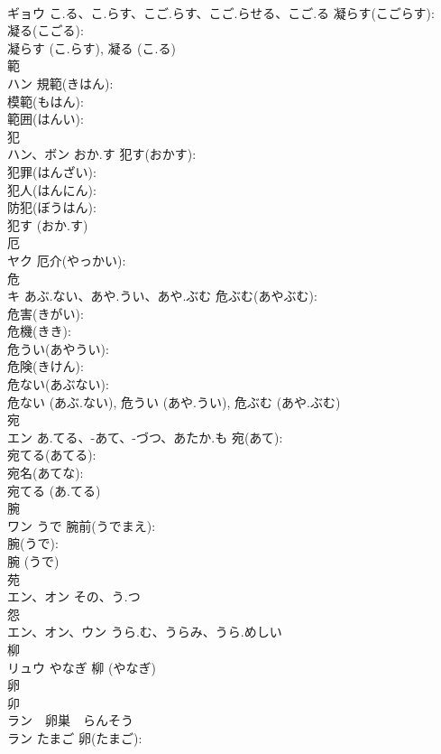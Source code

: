 \documentclass[8pt]{extreport}
\begin{document}
\begin{CJK}{UTF8}{min}
\\	ギョウ	こ.る、こ.らす、こご.らす、こご.らせる、こご.る	凝らす(こごらす): 
\\	凝る(こごる): 
\\	凝らす (こ.らす), 凝る (こ.る)
\\	範			
\\	ハン		規範(きはん): 
\\	模範(もはん): 
\\	範囲(はんい): 
\\	犯			
\\	ハン、ボン	おか.す	犯す(おかす): 
\\	犯罪(はんざい): 
\\	犯人(はんにん): 
\\	防犯(ぼうはん): 
\\	犯す (おか.す)
\\	厄			
\\	ヤク		厄介(やっかい): 
\\	危			
\\	キ	あぶ.ない、あや.うい、あや.ぶむ	危ぶむ(あやぶむ): 
\\	危害(きがい): 
\\	危機(きき): 
\\	危うい(あやうい): 
\\	危険(きけん): 
\\	危ない(あぶない): 
\\	危ない (あぶ.ない), 危うい (あや.うい), 危ぶむ (あや.ぶむ)
\\	宛			
\\	エン	あ.てる、-あて、-づつ、あたか.も	宛(あて): 
\\	宛てる(あてる): 
\\	宛名(あてな): 
\\	宛てる (あ.てる)
\\	腕			
\\	ワン	うで	腕前(うでまえ): 
\\	腕(うで): 
\\	腕 (うで)
\\	苑			
\\	エン、オン	その、う.つ		
\\	怨			
\\	エン、オン、ウン	うら.む、うらみ、うら.めしい		
\\	柳			
\\	リュウ	やなぎ		柳 (やなぎ)
\\	卵			
\\	卯
\\	ラン　卵巣　らんそう
\\	ラン	たまご	卵(たまご): 

\end{CJK}
\end{document}
